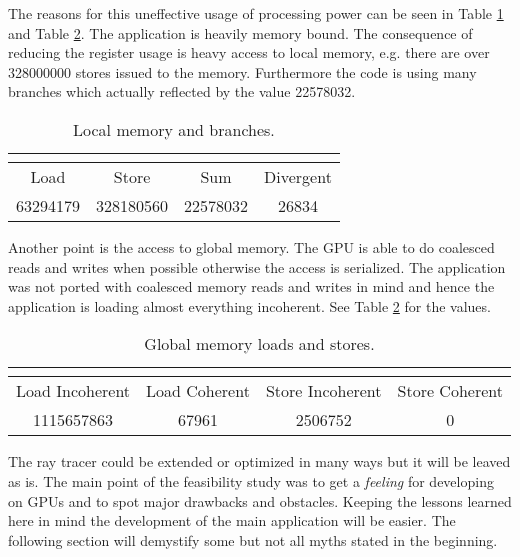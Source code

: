 The reasons for this uneffective usage of processing power can be seen in Table \ref{tab:localmem} and Table \ref{tab:globalmem}. The application is heavily memory bound. The consequence of reducing the register usage is heavy access to local memory, e.g. there are over 328000000 stores issued to the memory. Furthermore the code is using many branches which actually reflected by the value 22578032. 

\begin{table}[ht]
    \myfloatalign
  \begin{tabularx}{\textwidth}{cccc} \toprule
	\multicolumn{2}{c}{\spacedlowsmallcaps{Local Memory}} &
	\multicolumn{2}{c}{\spacedlowsmallcaps{Branches}} \\ \midrule
    Load & Store & Sum & Divergent\\
	63294179 & 328180560 & 22578032 & 26834\\
    \bottomrule
  \end{tabularx}
  \caption[Local memory and branches]{Local memory and branches.}
  \label{tab:localmem}
\end{table}

Another point is the access to global memory. The \gls{GPU} is able to do coalesced reads and writes when possible otherwise the access is serialized. 
The application was not ported with coalesced memory reads and writes in mind and hence the application is loading almost everything incoherent. See Table \ref{tab:globalmem} for the values. 

\begin{table}[ht]
    \myfloatalign
  \begin{tabularx}{\textwidth}{cccc} \toprule
	\multicolumn{4}{c}{\spacedlowsmallcaps{Global Memory}} \\ \midrule
    Load Incoherent & Load Coherent & Store Incoherent & Store Coherent \\
	1115657863 & 67961 & 2506752 & 0 \\
    \bottomrule
  \end{tabularx}
  \caption[Global memory loads and stores]{Global memory loads and stores.}
  \label{tab:globalmem}
\end{table}

The ray tracer could be extended or optimized in many ways but it will be leaved as is. The main point of the feasibility study was to get a \emph{feeling} for developing on \glspl{GPU} and to spot major drawbacks and obstacles. Keeping the lessons learned here in mind the development of the main application will be easier. The following section will demystify some but not all myths stated in the beginning.

